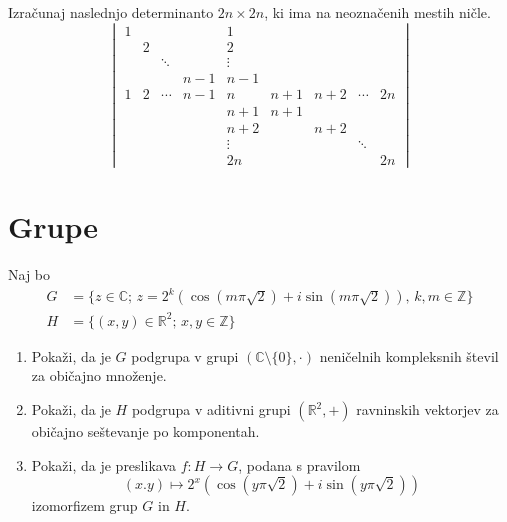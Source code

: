 \documentclass[a4paper,12pt]{article}
\begin{document}
Izračunaj naslednjo determinanto \(2n \times 2n\), ki ima na neoznačenih mestih ničle.
\[
\begin{vmatrix}
 1 & & & &  1 & & & &  \\
 & 2 & & &  2 & & & &  \\
 & & \ddots & & \vdots & & & &  \\
 & & & n -1 & n-1 & & & &  \\
 1 & 2 & \cdots & n-1 & n & n+1 & n+2 & \cdots & 2n  \\
 & & & & n +1 & n+1 & & & \\
 & & & & n +2 & & n+2 & &  \\
 & & & & \vdots & & & \ddots & \\
 & & & & 2 n & & & & 2n
\end{vmatrix}
\]


\section*{Grupe}

Naj bo
\begin{align*}
    G &= \{z \in \mathbb{C}; \, z= 2^k (\cos(m \pi \sqrt{2})+i \sin(m \pi \sqrt{2})), \, k,m \in \mathbb{Z}\} \\
    H &= \{(x,y) \in \mathbb{R}^2; \, x,y \in \mathbb{Z}\} 
\end{align*}
    

\begin{enumerate}
\item
Pokaži, da je \(G\) podgrupa v grupi \((\mathbb{C} \setminus \{0\}, \cdot)\)
neničelnih kompleksnih števil za običajno množenje.

\item
Pokaži, da je \(H\) podgrupa v aditivni grupi \((\mathbb{R}^2, +)\)
ravninskih vektorjev za običajno seštevanje po komponentah.

\item
Pokaži, da je preslikava \(f:H\to G\), podana s pravilom
\[
(x.y) \mapsto 2^x(\cos(y\pi\sqrt{2})+i\sin(y\pi\sqrt{2}))
\]
izomorfizem grup \(G\) in \(H\).
\end{enumerate}
\end{document}
